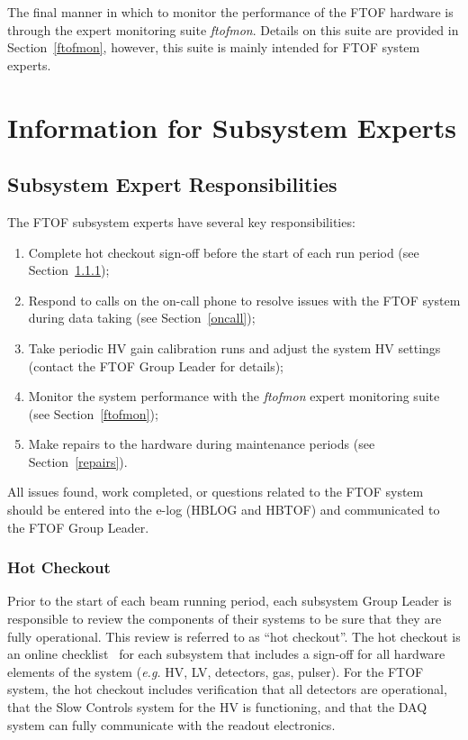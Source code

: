 \documentclass[12pt]{article}
\begin{document}
The final manner in which to monitor the performance of the FTOF hardware is through the expert
monitoring suite {\it ftofmon}. Details on this suite are provided in Section~\ref{ftofmon},
however, this suite is mainly intended for FTOF system experts.

\section{Information for Subsystem Experts}

\subsection{Subsystem Expert Responsibilities}

The FTOF subsystem experts have several key responsibilities:

\begin{enumerate}
\item Complete hot checkout sign-off before the start of each run period (see 
Section~\ref{checkout});
\item Respond to calls on the on-call phone to resolve issues with the FTOF system 
during data taking (see Section~\ref{oncall});
\item Take periodic HV gain calibration runs and adjust the system HV settings (contact
the FTOF Group Leader for details);
\item Monitor the system performance with the {\it ftofmon} expert monitoring suite
(see Section~\ref{ftofmon});
\item Make repairs to the hardware during maintenance periods (see Section~\ref{repairs}).
\end{enumerate}

All issues found, work completed, or questions related to the FTOF system should be 
entered into the e-log (HBLOG and HBTOF) and communicated to the FTOF Group Leader.

\subsubsection{Hot Checkout}
\label{checkout}

Prior to the start of each beam running period, each subsystem Group Leader is 
responsible to review the components of their systems to be sure that they are fully 
operational. This review is referred to as ``hot checkout''. The hot checkout is an 
online checklist~\cite{hco-page} for each subsystem that includes a sign-off for all
hardware elements of the system ({\it e.g.} HV, LV, detectors, gas, pulser). For the
FTOF system, the hot checkout includes verification that all detectors are operational,
that the Slow Controls system for the HV is functioning, and that the DAQ system can
fully communicate with the readout electronics. 
\end{document}
